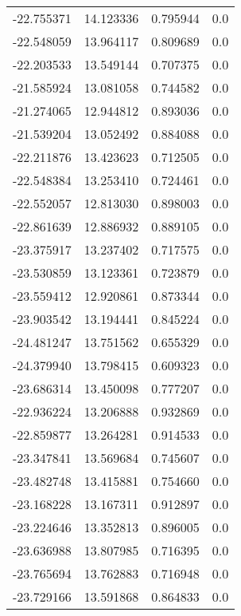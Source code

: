 \begin{tabular}{rrrr}
      -22.755371 &        14.123336 &    0.795944 &   0.0 \\
      -22.548059 &        13.964117 &    0.809689 &   0.0 \\
      -22.203533 &        13.549144 &    0.707375 &   0.0 \\
      -21.585924 &        13.081058 &    0.744582 &   0.0 \\
      -21.274065 &        12.944812 &    0.893036 &   0.0 \\
      -21.539204 &        13.052492 &    0.884088 &   0.0 \\
      -22.211876 &        13.423623 &    0.712505 &   0.0 \\
      -22.548384 &        13.253410 &    0.724461 &   0.0 \\
      -22.552057 &        12.813030 &    0.898003 &   0.0 \\
      -22.861639 &        12.886932 &    0.889105 &   0.0 \\
      -23.375917 &        13.237402 &    0.717575 &   0.0 \\
      -23.530859 &        13.123361 &    0.723879 &   0.0 \\
      -23.559412 &        12.920861 &    0.873344 &   0.0 \\
      -23.903542 &        13.194441 &    0.845224 &   0.0 \\
      -24.481247 &        13.751562 &    0.655329 &   0.0 \\
      -24.379940 &        13.798415 &    0.609323 &   0.0 \\
      -23.686314 &        13.450098 &    0.777207 &   0.0 \\
      -22.936224 &        13.206888 &    0.932869 &   0.0 \\
      -22.859877 &        13.264281 &    0.914533 &   0.0 \\
      -23.347841 &        13.569684 &    0.745607 &   0.0 \\
      -23.482748 &        13.415881 &    0.754660 &   0.0 \\
      -23.168228 &        13.167311 &    0.912897 &   0.0 \\
      -23.224646 &        13.352813 &    0.896005 &   0.0 \\
      -23.636988 &        13.807985 &    0.716395 &   0.0 \\
      -23.765694 &        13.762883 &    0.716948 &   0.0 \\
      -23.729166 &        13.591868 &    0.864833 &   0.0 \\

\end{tabular}
